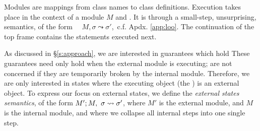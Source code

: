  Modules are mappings
from class names to class definitions. 
Execution takes place in the context of  a module $M$ and   .
It is %
  through a small-step, unsurprising, semantics, of the form \ \ 
   $M, \sigma \leadsto \sigma'$,\  c.f. Apdx. \ref{app:loo}.
The   continuation of the top frame contains the statements  %
executed next.
 
As discussed in \S \ref{s:approach}, we are interested in guarantees which hold
 These guarantees need only hold 
when the external module is executing; \scd{we} are not concerned if they are
temporarily broken by the internal module. Therefore, we are only interested in states where the
executing object (the \prg{this}) is an external object. 
To express our focus on external states, we define the  \emph{external states semantics}, of the form 
$M' ; M,\ \sigma \leadsto \sigma'$, where $M'$ is the external
module, and $M$ is the internal module, and where we
collapse all internal steps into one single step.

 

